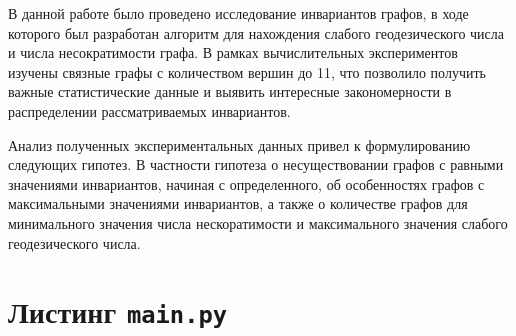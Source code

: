 \documentclass[bachelor, och, nir]{SCWorks}
\begin{document}
\conclusion
В данной работе было проведено исследование инвариантов графов, в ходе которого был разработан алгоритм для нахождения слабого геодезического числа и числа несократимости графа. 
 В рамках вычислительных экспериментов изучены связные графы с количеством вершин до 11, что позволило получить важные статистические данные и выявить интересные закономерности в распределении рассматриваемых инвариантов.

Анализ полученных экспериментальных данных привел к формулированию следующих гипотез. В частности гипотеза о несуществовании графов с равными значениями инвариантов, начиная с определенного, об особенностях графов с максимальными значениями инвариантов, а также о количестве графов для минимального значения числа нескоратимости и максимального значения слабого геодезического числа.



\newpage



\newpage
\appendix

\section{Листинг \texttt{main.py}}
\end{document}
